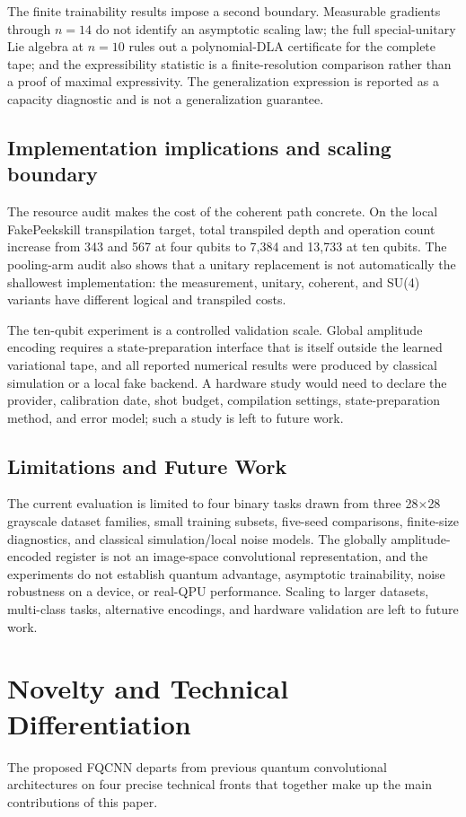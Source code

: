 \documentclass[conference]{IEEEtran}
\begin{document}
The finite trainability results impose a second boundary. Measurable gradients
through $n=14$ do not identify an asymptotic scaling law; the full
special-unitary Lie algebra at $n=10$ rules out a polynomial-DLA certificate
for the complete tape; and the expressibility statistic is a
finite-resolution comparison rather than a proof of maximal expressivity.
The generalization expression is reported as a capacity diagnostic and is
not a generalization guarantee.

\subsection{Implementation implications and scaling boundary}
The resource audit makes the cost of the coherent path concrete. On the local
FakePeekskill transpilation target, total transpiled depth and operation count
increase from 343 and 567 at four qubits to 7,384 and 13,733 at ten qubits.
The pooling-arm audit also shows that a unitary replacement is not automatically
the shallowest implementation: the measurement, unitary, coherent, and SU(4)
variants have different logical and transpiled costs. 

The ten-qubit experiment is a controlled validation scale. Global amplitude
encoding requires a state-preparation interface that is itself outside the
learned variational tape, and all reported numerical results were produced by
classical simulation or a local fake backend. A hardware study would need to
declare the provider, calibration date, shot budget, compilation settings,
state-preparation method, and error model; such a study is left to future
work.

\subsection{Limitations and Future Work}
The current evaluation is limited to four binary tasks drawn from three 28$\times$28 grayscale dataset families, small training subsets, five-seed comparisons, finite-size diagnostics, and classical simulation/local noise models. The globally amplitude-encoded register is not an image-space convolutional representation, and the experiments do not establish quantum advantage, asymptotic trainability, noise robustness on a device, or real-QPU performance. Scaling to larger datasets, multi-class tasks, alternative encodings, and hardware validation are left to future work.

\section{Novelty and Technical Differentiation}
The proposed FQCNN departs from previous quantum convolutional architectures on four precise technical fronts that together make up the main contributions of this paper.
\end{document}
